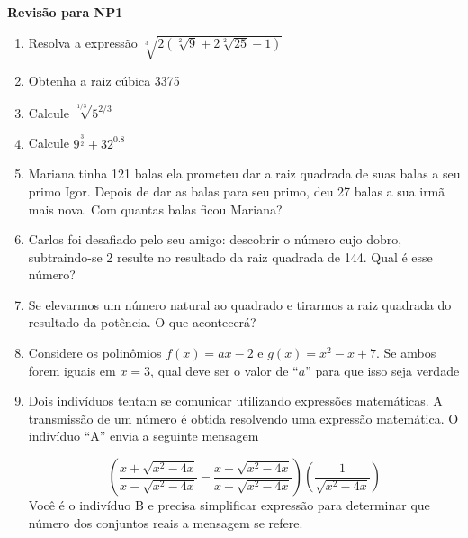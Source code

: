 \documentclass[12pt,onepage,a4paper]{memoir}
\newcommand{\tit}{Revisão para NP1}
\begin{document}
\thispagestyle{1pagina}
\vspace*{2.5cm} %

\vspace{0.5cm}
\textbf{\textsf{\large \tit}} %



\begin{enumerate} %
\item Resolva a expressão $\sqrt[3]{2\left( \sqrt[2]{9}+2\sqrt[2]{25} - 1
    \right)}$

\item Obtenha a raiz cúbica 3375

\item Calcule $\sqrt[1/3]{5^{2/3}}$

\item Calcule $9^{\frac{3}{2}} + 32^{0.8}$
  \item Mariana tinha 121 balas ela prometeu dar a raiz quadrada de suas balas a
    seu primo Igor. Depois de dar as balas para seu primo, deu 27 balas a sua
    irmã mais nova. Com quantas balas ficou Mariana?
    \item Carlos foi desafiado pelo seu amigo: descobrir o número cujo dobro,
      subtraindo-se 2 resulte no resultado da raiz quadrada de 144. Qual é esse
      número?

      \item Se elevarmos um número natural ao quadrado e tirarmos a raiz
        quadrada do resultado da potência. O que acontecerá?

        \item Considere os polinômios $f(x) = ax -2$ e $g(x) = x^2 - x + 7$. Se
          ambos forem iguais em $x=3$, qual deve ser o valor de “$a$” para que
          isso seja verdade

          \item  Dois indivíduos tentam se comunicar utilizando expressões matemáticas. A transmissão de um número é obtida resolvendo uma expressão matemática. O indivíduo “A” envia a seguinte mensagem 

\begin{equation}
  \left( \frac{x + \sqrt{x^2-4x}}{x - \sqrt{x^2-4x}}  - \frac{x - \sqrt{x^2-4x}}{x + \sqrt{x^2-4x}} \right)\left( \frac{1}{\sqrt{x^2-4x}}\right)
\end{equation}
Você é o indivíduo B e precisa simplificar expressão para determinar que número
dos conjuntos reais a mensagem se refere.


\end{enumerate}
\end{document}
